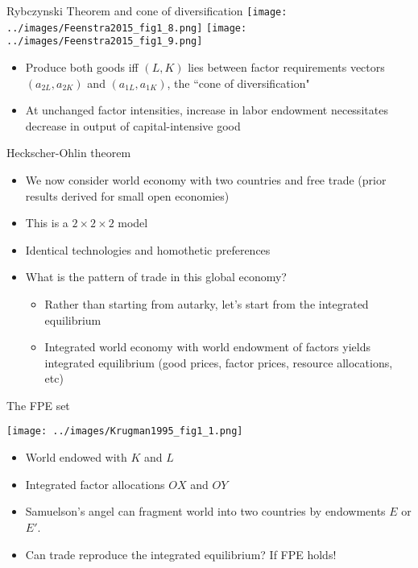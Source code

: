 \documentclass[10pt,notes=hide]{beamer}
\begin{document}
\begin{frame}{Rybczynski Theorem and cone of diversification}
\texttt{[image: ../images/Feenstra2015\_fig1\_8.png]}
\texttt{[image: ../images/Feenstra2015\_fig1\_9.png]}
\begin{itemize}
	\item Produce both goods iff $\left( L,K\right) $ lies between
factor requirements vectors $\left( a_{2L},a_{2K}\right) $ and $\left(
a_{1L},a_{1K}\right) $, the   ``cone of diversification"
\item At unchanged factor intensities, increase in labor endowment necessitates decrease in output of capital-intensive good
\end{itemize}
\end{frame}
\begin{frame}{Heckscher-Ohlin theorem}
\begin{itemize}
	\item We now consider world economy with two countries and free trade (prior results derived for small open economies)
	\item This is a $2 \times 2 \times 2$ model
	\item Identical technologies and homothetic preferences
	\item What is the pattern of trade in this global economy?
	\begin{itemize}
		\item Rather than starting from autarky, let's start from the integrated equilibrium
		\item Integrated world economy with world endowment of factors yields integrated equilibrium (good prices, factor prices, resource allocations, etc)
	\end{itemize}
\end{itemize}
\end{frame}
\begin{frame}{The FPE set}
\vspace{-3mm}
\begin{center}\texttt{[image: ../images/Krugman1995\_fig1\_1.png]}\end{center}
\vspace{-3mm}
\begin{itemize}
	\item World endowed with $K$ and $L$
	\item Integrated factor allocations $OX$ and $OY$
	\item Samuelson's angel can fragment world into two countries by endowments $E$ or $E'$.
	\item Can trade reproduce the integrated equilibrium?
	If FPE holds!
\end{itemize}
\end{frame}
\end{document}
